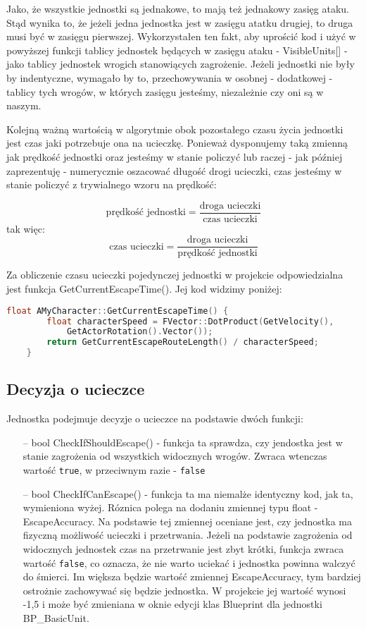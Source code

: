 \documentclass[12pt]{report}
\begin{document}
Jako, że wszystkie jednostki są jednakowe, to mają też jednakowy zasięg ataku. Stąd wynika to, że jeżeli jedna jednostka jest w zasięgu atatku drugiej, to druga musi być w zasięgu pierwszej. Wykorzystałen ten fakt, aby uprościć kod i użyć w powyższej funkcji tablicy jednostek będących w zasięgu ataku - VisibleUnits[] - jako tablicy jednostek wrogich stanowiących zagrożenie. Jeżeli jednostki nie były by indentyczne, wymagało by to, przechowywania w osobnej - dodatkowej - tablicy tych wrogów, w których zasięgu jesteśmy, niezależnie czy oni są w naszym.

Kolejną ważną wartością w algorytmie obok pozostałego czasu życia jednostki jest czas jaki potrzebuje ona na ucieczkę. Ponieważ dysponujemy taką zmienną jak prędkość jednostki oraz jesteśmy w stanie policzyć lub raczej - jak później zaprezentuję - numerycznie oszacować długość drogi ucieczki, czas jesteśmy w stanie policzyć z trywialnego wzoru na prędkość:

\[ \text{prędkość jednostki} =  \dfrac{\text{droga ucieczki}}{\text{czas ucieczki}}  \]
tak więc:
\[ {\text{czas ucieczki}} =  \dfrac{\text{droga ucieczki}}{\text{prędkość jednostki}}  \]


Za obliczenie czasu ucieczki pojedynczej jednostki w projekcie odpowiedzialna jest funkcja GetCurrentEscapeTime(). Jej kod widzimy poniżej: 

\begin{lstlisting}[language=C++, backgroundcolor=\color{black!5}, basicstyle=\footnotesize, caption=Funkcja GetCurrentEscapeTime w klasie \texttt{AMyCharacter.cpp}.]
	float AMyCharacter::GetCurrentEscapeTime() {
		float characterSpeed = FVector::DotProduct(GetVelocity(), 
		    GetActorRotation().Vector());
		return GetCurrentEscapeRouteLength() / characterSpeed;
	}
\end{lstlisting}

\subsection{Decyzja o ucieczce}

Jednostka podejmuje decyzje o ucieczce na podstawie dwóch funkcji: 
\begin{itemize}
\item[--] bool CheckIfShouldEscape() - funkcja ta sprawdza, czy jendostka jest w stanie zagrożenia od wszystkich widocznych wrogów. Zwraca wtenczas wartość \texttt{true}, w przeciwnym razie - \texttt{false}
\item[--] bool CheckIfCanEscape() - funkcja ta ma niemalże identyczny kod, jak ta, wymieniona wyżej. Róznica polega na dodaniu zmiennej typu float - EscapeAccuracy. Na podstawie tej zmiennej oceniane jest, czy jednostka ma fizyczną możliwość ucieczki i przetrwania. Jeżeli na podstawie zagrożenia od widocznych jednostek czas na przetrwanie jest zbyt krótki, funkcja zwraca wartość \texttt{false}, co oznacza, że nie warto uciekać i jednostka powinna walczyć do śmierci. Im większa będzie wartość zmiennej EscapeAccuracy, tym bardziej ostrożnie zachowywać się będzie jednostka. W projekcie jej wartość wynosi -1,5 i może być zmieniana w oknie edycji klas Blueprint dla jednostki BP\_BasicUnit.
\end{itemize}
\end{document}
